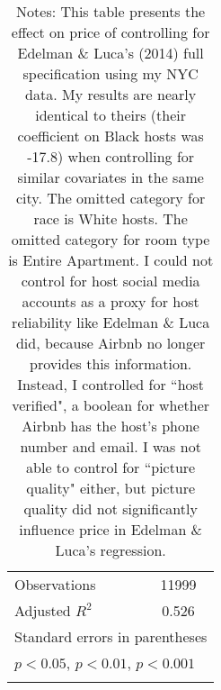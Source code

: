 {\begin{longtable}{l*{1}{c}}
\hline
Observations        &       11999         \\
Adjusted \(R^{2}\)  &       0.526         \\
\hline\hline
\multicolumn{2}{l}{\footnotesize Standard errors in parentheses}\\
\multicolumn{2}{l}{\footnotesize \sym{*} \(p<0.05\), \sym{**} \(p<0.01\), \sym{***} \(p<0.001\)}\\
\caption*{\footnotesize Notes: This table presents the effect on price of controlling for Edelman \& Luca's (2014) full specification using my NYC data. My results are nearly identical to theirs (their coefficient on Black hosts was -17.8) when controlling for similar covariates in the same city. The omitted category for race is White hosts. The omitted category for room type is Entire Apartment. I could not control for host social media accounts as a proxy for host reliability like Edelman \& Luca did, because Airbnb no longer provides this information. Instead, I controlled for ``host verified", a boolean for whether Airbnb has the host's phone number and email. I was not able to control for ``picture quality" either, but picture quality did not significantly influence price in Edelman \& Luca's regression.}\\
\end{longtable}
}


